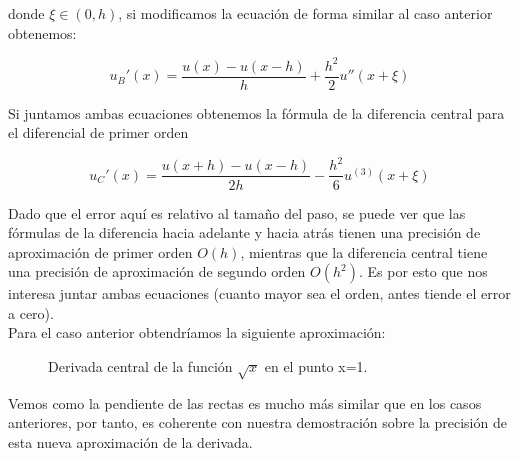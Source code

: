 \documentclass[12pt]{article}
\begin{document}
donde $\xi\in (0,h)$, si modificamos la ecuación de forma similar al caso anterior obtenemos:

\begin{equation}
u_B'(x)=\frac{u(x)-u(x-h)}{h} + \frac{h^2}{2}u''(x+\xi)
\end{equation}

Si juntamos ambas ecuaciones obtenemos la fórmula de la diferencia central para el diferencial de primer orden

\begin{equation}
u_C'(x)=\frac{u(x+h)-u(x-h)}{2h} - \frac{h^2}{6}u^{(3)}(x+\xi)
\end{equation}

Dado que el error aquí es relativo al tamaño del paso, se puede ver que las fórmulas de la diferencia hacia adelante y hacia atrás tienen una precisión de aproximación de primer orden $O(h)$, mientras que la diferencia central tiene una precisión de aproximación de segundo orden $O(h^2)$. Es por esto que nos interesa juntar ambas ecuaciones (cuanto mayor sea el orden, antes tiende el error a cero).\\

Para el caso anterior obtendríamos la siguiente aproximación:

\begin{figure}[H]
\centering
{}
\caption{Derivada central de la función $\sqrt{x}$ en el punto x=1.}
\end{figure}

Vemos como la pendiente de las rectas es mucho más similar que en los casos anteriores, por tanto, es coherente con nuestra demostración sobre la precisión de esta nueva aproximación de la derivada.
\end{document}
